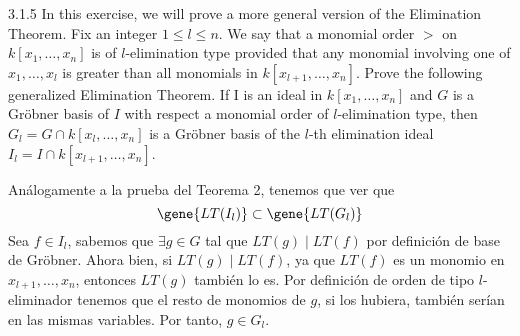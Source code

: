 \documentclass[twoside]{article}
\begin{document}
\begin{ejercicio}{3.1.5}
In this exercise, we will prove a more general version of the Elimination Theorem. Fix an integer $1\leq l \leq n$. We say that a monomial order $>$ on $k[x_1,\dotsc, x_n]$ is of $l$-elimination type provided that any monomial involving one of $x_1,\dotsc, x_l$ is greater than all monomials in $k[x_{l+1}, \dotsc, x_n]$. Prove the following generalized Elimination Theorem. If I is an ideal in $k[x_1,\dotsc, x_n]$ and $G$ is a  Gröbner basis of $I$ with respect a monomial order of $l$-elimination type, then $G_l = G\cap k[x_l,\dotsc, x_n]$ is a Gröbner basis of the $l$-th elimination ideal $I_l = I\cap k[x_{l+1},\dotsc, x_n]$.
\end{ejercicio}
\begin{solucion}
Análogamente a la prueba del Teorema 2, tenemos que ver que $$\gene{LT(I_l)}\subset \gene{LT(G_l)}$$
Sea $f\in I_l$, sabemos que $\exists g \in G$ tal que $LT(g)\mid LT(f)$ por definición de base de Gröbner. Ahora bien, si $LT(g)\mid LT(f)$, ya que $LT(f)$ es un monomio en $x_{l+1},\dotsc,x_n$, entonces $LT(g)$ también lo es. Por definición de  orden de tipo $l$-eliminador tenemos que el resto de monomios de $g$, si los hubiera, también serían en las mismas variables. Por tanto, $g\in G_l$.
\end{solucion}


\newpage
\end{document}
